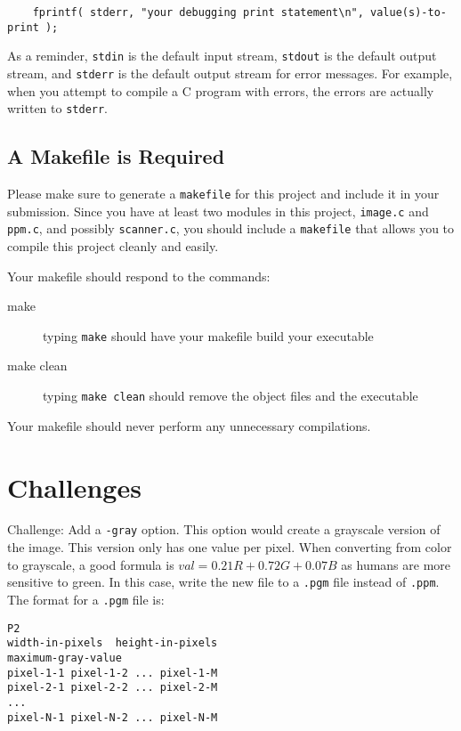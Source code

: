\documentclass[12pt]{article}
\begin{document}
\begin{verbatim}
    fprintf( stderr, "your debugging print statement\n", value(s)-to-print );
\end{verbatim}

As a reminder, {\tt stdin} is the default input stream, {\tt stdout} is the
default output stream, and {\tt stderr} is the default output stream for error
messages.  For example, when you attempt to compile a 
C program with errors, the errors are actually written to {\tt stderr}.

\subsection*{A Makefile is Required}

Please make sure to generate a {\tt makefile} for this project and include it in your
submission.  Since you have at least two modules in this project,
{\tt image.c} and {\tt ppm.c}, and possibly {\tt scanner.c},
you should include a {\tt makefile} that
allows you to compile this project cleanly and easily.

Your makefile should respond to the commands:

\begin{description}
\item[make] typing \verb!make! should have your makefile build your executable
\item[make clean] typing \verb!make clean! should remove the object files and the executable
\end{description}

Your makefile should never perform any unnecessary compilations.

\section*{Challenges}

Challenge: Add a {\tt -gray} option.  This option would create a grayscale
version of the image.  This version only has one value per pixel.  When
converting from color to grayscale, a good formula is
$val = 0.21R + 0.72G + 0.07B$ as humans are more sensitive to green.
In this case, write the new file to a {\tt .pgm} file instead of {\tt .ppm}.
The format for a {\tt .pgm} file is:

\begin{verbatim}
P2
width-in-pixels  height-in-pixels
maximum-gray-value
pixel-1-1 pixel-1-2 ... pixel-1-M
pixel-2-1 pixel-2-2 ... pixel-2-M
...
pixel-N-1 pixel-N-2 ... pixel-N-M
\end{verbatim}
\end{document}
